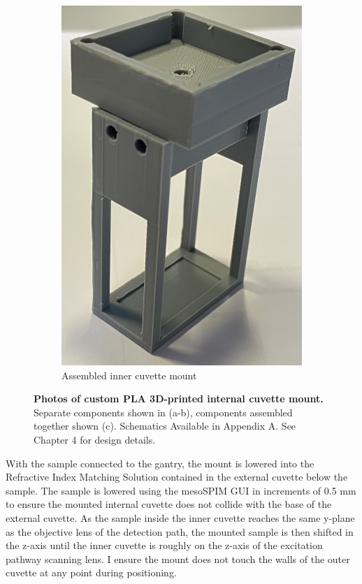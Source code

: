 \begin{figure}[H]
\begin{subfigure}[a]{0.25\textwidth}
    \includegraphics[width=1\linewidth]{Images/Combined_Mount.png}
    \caption{Assembled inner cuvette mount}
    \end{subfigure}
    
    \caption{\textbf{Photos of custom PLA 3D-printed internal cuvette mount.} Separate components shown in (a-b), components assembled together shown (c). Schematics Available in Appendix A. See Chapter 4 for design details.}
    \label{fig:enter-label}
\end{figure}

With the sample connected to the gantry, the mount is lowered into the Refractive Index Matching Solution contained in the external cuvette below the sample. The sample is lowered using the mesoSPIM GUI in increments of 0.5 mm to ensure the mounted internal cuvette does not collide with the base of the external cuvette. As the sample inside the inner cuvette reaches the same y-plane as the objective lens of the detection path, the mounted sample is then shifted in the z-axis until the inner cuvette is roughly on the z-axis of the excitation pathway scanning lens. I ensure the mount does not touch the walls of the outer cuvette at any point during positioning. 

